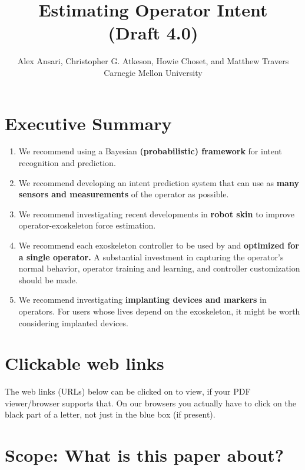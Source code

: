 \documentclass[letterpaper,12pt,fullpage]{article}
\begin{document}
\title{Estimating Operator Intent\\
(Draft 4.0)}

\author{Alex Ansari, Christopher G. Atkeson, Howie Choset, and Matthew Travers\\
Carnegie Mellon University}

\maketitle

\section{Executive Summary}

\begin{enumerate}
\item
We recommend using a Bayesian {\bf (probabilistic) framework}
for intent recognition and prediction.
\item
We recommend developing an intent prediction system that can use
as {\bf many sensors and measurements} of the operator as possible.
\item
We recommend investigating recent developments in {\bf robot skin} to improve
operator-exoskeleton force estimation.
\item
We recommend each exoskeleton controller
to be used by and {\bf optimized for a single operator.}
A substantial investment in capturing the operator's normal behavior,
operator training and learning, and controller customization should be made.
\item
We recommend investigating {\bf implanting devices and markers} in operators.
For users whose lives depend on the exoskeleton,
it might be worth considering implanted devices.
\end{enumerate}

\section{Clickable web links}

The web links (URLs) below can be clicked on to view, if your PDF viewer/browser supports that. On our browsers you actually have to click on the black
part of a letter, not just in the blue box (if present).

\section{Scope: What is this paper about?}
\end{document}
